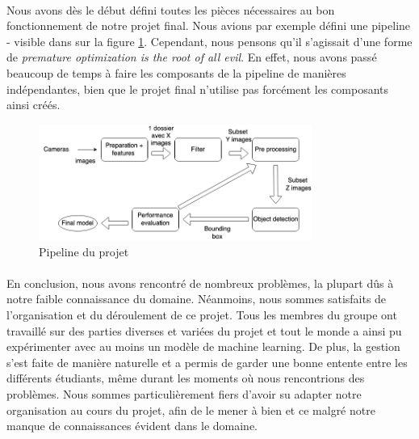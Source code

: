 \paragraph{} Nous avons dès le début défini toutes les pièces nécessaires au bon fonctionnement de notre projet final. Nous avions par exemple défini une pipeline - visible dans sur la figure \ref{fig:pipeline}. Cependant, nous pensons qu'il s'agissait d'une forme de \textit{premature optimization is the root of all evil}. En effet, nous avons passé beaucoup de temps à faire les composants de la pipeline de manières indépendantes, bien que le projet final n'utilise pas forcément les composants ainsi créés.

\begin{figure}[H]
    \centering
    \includegraphics[width=0.8\textwidth]{images/pipeline.png}
    \caption{Pipeline du projet}    
    \label{fig:pipeline}
\end{figure}
\paragraph{} En conclusion, nous avons rencontré de nombreux problèmes, la plupart dûs à notre faible connaissance du domaine. Néanmoins, nous sommes satisfaits de l'organisation et du déroulement de ce projet. Tous les membres du groupe ont travaillé sur des parties diverses et variées du projet et tout le monde a ainsi pu expérimenter avec au moins un modèle de machine learning. De plus, la gestion s'est faite de manière naturelle et a permis de garder une bonne entente entre les différents étudiants, même durant les moments où nous rencontrions des problèmes. Nous sommes particulièrement fiers d'avoir su adapter notre organisation au cours du projet, afin de le mener à bien et ce malgré notre manque de connaissances évident dans le domaine.